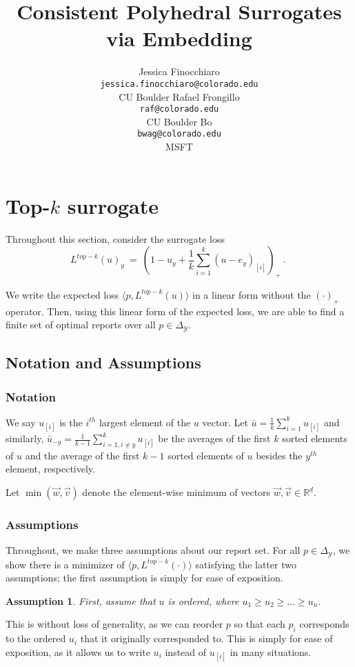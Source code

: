 \documentclass[12pt]{article}
\title{Consistent Polyhedral Surrogates via Embedding}
\author{%
 Jessica Finocchiaro\raf{Jessie?} \\
 \texttt{jessica.finocchiaro@colorado.edu}\\
 CU Boulder
 \And
 Rafael Frongillo\\
 \texttt{raf@colorado.edu}\\
 CU Boulder
 \And
 Bo\\
 \texttt{bwag@colorado.edu}\\
 MSFT
}
\newcommand{\reals}{\mathbb{R}}
\newcommand{\simplex}{\Delta_\Y}
\newcommand{\Y}{\mathcal{Y}}
\newcommand{\inprod}[2]{\langle #1, #2 \rangle}%
\DeclareMathOperator*{\argmax}{arg\,max}
\newtheorem{assumption}{Assumption}
\begin{document}
\section{Top-$k$ surrogate}

Throughout this section, consider the surrogate loss \begin{equation}\label{eq:top-k-surrogate}
L^{top-k}(u)_y~=~\left(1 - u_y + \frac{1}{k} \sum_{i=1}^k (u - e_y)_{[i]} \right)_+~.~
\end{equation}

We write the expected loss $\inprod{p}{L^{top-k}(u)}$ in a linear form without the $(\cdot)_+$ operator.
Then, using this linear form of the expected loss, we are able to find a finite set of optimal reports over all $p \in \simplex$.

\subsection{Notation and Assumptions}
\subsubsection{Notation}
We say $u_{[i]}$ is the $i^{th}$ largest element of the $u$ vector.
Let $\bar{u} = \frac 1 k \sum_{i = 1}^k u_{[i]}$ and similarly, $\bar{u}_{-y} = \frac{1}{k-1} \sum_{i=1, i \neq y}^k u_{[i]}$ be the averages of the first $k$ sorted elements of $u$ and the average of the first $k-1$ sorted elements of $u$ besides the $y^{th}$ element, respectively.

Let $\min(\vec w, \vec v)$ denote the element-wise minimum of vectors $\vec w, \vec v \in \reals^d$.

\subsubsection{Assumptions}\label{sec:assumptions}
Throughout, we make three assumptions about our report set. 
For all $p \in \simplex$, we show there is a minimizer of $\inprod{p}{L^{top-k}(\cdot)}$ satisfying the latter two assumptions; the first assumption is simply for ease of exposition.

\begin{assumption}\label{assum:ordered-u}
First, assume that $u$ is ordered, where $u_1 \geq u_2 \geq \ldots \geq u_n$.
\end{assumption}
This is without loss of generality, as we can reorder $p$ so that each $p_i$ corresponds to the ordered $u_i$ that it originally corresponded to.
This is simply for ease of exposition, as it allows us to write $u_i$ instead of $u_{[i]}$ in many situations. 
\end{document}

